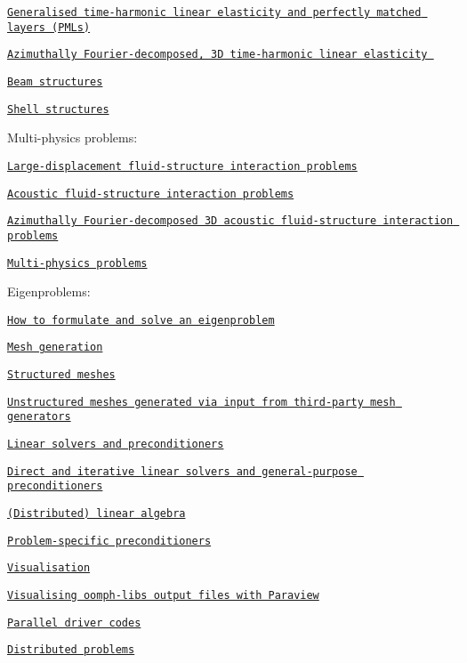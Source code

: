 \begin{DoxyEnumerate}
\begin{DoxyItemize}
\begin{DoxyItemize}
\item \href{#gen_time_harmonic_lin_elas}{\tt Generalised time-\/harmonic linear elasticity and perfectly matched layers (P\+M\+Ls)}
\item \href{#fourier_decomp_lin_elas}{\tt Azimuthally Fourier-\/decomposed, 3D time-\/harmonic linear elasticity }
\item \href{#beam}{\tt Beam structures}
\item \href{#shell}{\tt Shell structures}
\end{DoxyItemize}
\item Multi-\/physics problems\+:
\begin{DoxyItemize}
\item \href{#fsi}{\tt Large-\/displacement fluid-\/structure interaction problems}
\item \href{#acoustic_fsi}{\tt Acoustic fluid-\/structure interaction problems}
\item \href{#fd_acoustic_fsi}{\tt Azimuthally Fourier-\/decomposed 3D acoustic fluid-\/structure interaction problems}
\item \href{#multi}{\tt Multi-\/physics problems}
\end{DoxyItemize}
\item Eigenproblems\+:
\begin{DoxyItemize}
\item \href{#eigen}{\tt How to formulate and solve an eigenproblem}
\end{DoxyItemize}
\end{DoxyItemize}
\item \href{#meshes}{\tt Mesh generation}
\begin{DoxyItemize}
\item \href{#available_meshes}{\tt Structured meshes}
\item \href{#third_party_meshes}{\tt Unstructured meshes generated via input from third-\/party mesh generators}
\end{DoxyItemize}
\item \href{#solvers}{\tt Linear solvers and preconditioners}
\begin{DoxyItemize}
\item \href{#linear_solvers}{\tt Direct and iterative linear solvers and general-\/purpose preconditioners}
\item \href{#lin_alg}{\tt (Distributed) linear algebra}
\item \href{#specific_preconditioners}{\tt Problem-\/specific preconditioners}
\end{DoxyItemize}
\item \href{#visualisation}{\tt Visualisation}
\begin{DoxyItemize}
\item \href{#paraview}{\tt Visualising oomph-\/lib\textquotesingle{}s output files with Paraview}
\end{DoxyItemize}
\item \href{#parallel}{\tt Parallel driver codes}
\begin{DoxyItemize}
\item \href{#distributed}{\tt Distributed problems}
\end{DoxyItemize}
\end{DoxyEnumerate} 
